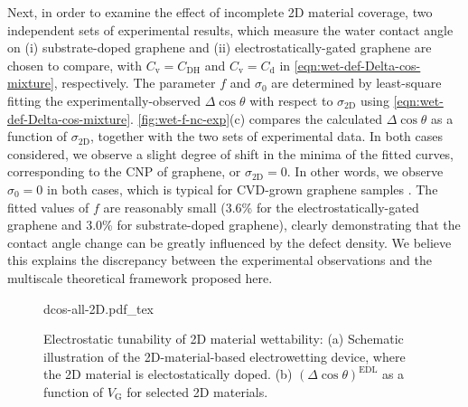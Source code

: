 Next, in order to examine the effect of incomplete 2D material
coverage, two independent sets of experimental results, which measure
the water contact angle on (i) substrate-doped graphene
\cite{Ashraf_2016_doping} and (ii) electrostatically-gated
graphene \cite{Hong_2016_mechanism} are chosen to compare, with
\(C_{\mathrm{v}} = C_{\mathrm{DH}}\) and \(C_{\mathrm{v}} =
C_{\mathrm{d}}\) in \autoref{eqn:wet-def-Delta-cos-mixture}, respectively. The
parameter \(f\) and \(\sigma_{0}\) are determined by least-square fitting
the experimentally-observed \(\Delta \cos \theta\) with respect to
\(\sigma_{\mathrm{2D}}\) using \autoref{eqn:wet-def-Delta-cos-mixture}. 
\autoref{fig:wet-f-nc-exp}(c) compares the calculated \(\Delta \cos \theta\) as a
function of \(\sigma_{\mathrm{2D}}\), together with the two sets of
experimental data. In both cases considered, we observe a slight
degree of shift in the minima of the fitted curves, corresponding to
the CNP of graphene, or \(\sigma_{\mathrm{2D}} = 0\). In other words, we
observe \(\sigma_{0} = 0\) in both cases, which is typical for
CVD-grown graphene samples
\cite{Shih_2015_PartiallyScreened,goniszewski_correlation_2016}.  The
fitted values of \(f\) are reasonably small (3.6\% for the
electrostatically-gated graphene and 3.0\% for substrate-doped
graphene), clearly demonstrating that the contact angle change can be
greatly influenced by the defect density. We believe this explains the
discrepancy between the experimental observations and the multiscale
theoretical framework proposed here.

\begin{figure}[!htbp]
  \centering
  {dcos-all-2D.pdf_tex}
\caption{\label{fig:wet-dcos-all-2D} Electrostatic tunability of 2D
  material wettability: (a) Schematic illustration of the
  2D-material-based electrowetting device, where the 2D material is
  electostatically doped. (b) \((\Delta\cos\theta)^{\mathrm{EDL}}\) as
  a function of \(V_{\mathrm{G}}\) for selected 2D materials.}
\end{figure}


